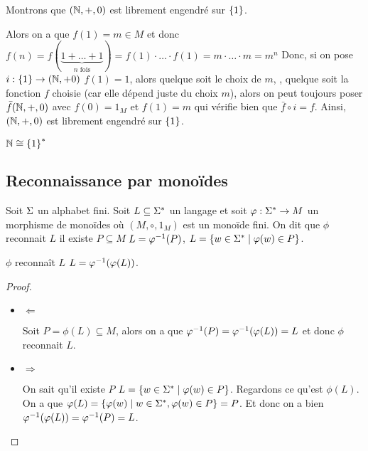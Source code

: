 \begin{exemple}
Montrons que $(\mathbb{N}, + , 0)$ est librement engendré sur $\left\{1\right\}$.


	Alors on a que $f(1) = m \in M$ et donc $f(n) =  f(\underbrace{1+\ldots+1}_{n \text{ fois}}) = f(1)\cdot \ldots \cdot f(1) = m\cdot \ldots \cdot m = m^n$
    Donc, si on pose $i: \left\{1\right\} \to (\mathbb{N}, + 0)$ \tq $f(1) = 1$, alors quelque soit le choix de $m$, \ie, quelque soit la fonction $f$ choisie (car elle dépend juste du choix $m$), alors 
    on peut toujours poser $\bar f (\mathbb{N}, +, 0)$ avec $f(0) = 1_M$ et $f(1) = m$ qui vérifie bien que $\bar f \circ i = f$. Ainsi, $(\mathbb{N}, +, 0)$ est librement engendré sur $\left\{1\right\}$.
\end{exemple}

\begin{remarque}
	$\mathbb{N} \cong \left\{1\right\}^*$
\end{remarque}

\subsection{Reconnaissance par monoïdes}

\begin{definition}
	Soit $\Sigma$ un alphabet fini. Soit $L \subseteq \Sigma^{*}$ un langage et soit $\varphi : \Sigma^{*} \to M$ un morphisme de monoïdes où $(M, \circ, 1_M)$ est un monoïde fini. On dit que
	$\phi$ reconnait $L$ \ssi il existe $P \subseteq M$ \tq $L = \varphi^{-1} (P)$, \cad $L = \left\{w \in \Sigma^{*} \mid \varphi (w) \in P\right\}$.
\end{definition}

\begin{exercice}
	$\phi$ reconnaît $L$ \ssi $L = \varphi^{-1} (\varphi (L))$.
\end{exercice}

\begin{proof}
    \begin{itemize}
        \item $\Leftarrow$

            Soit $P = \phi(L) \subseteq M$, alors on a que $\varphi^{-1} (P) = \varphi^{-1} (\varphi (L)) = L$ et donc $\phi$ reconnait $L$.

        \item $\Rightarrow$

            On sait qu'il existe $P$ \tq $L = \left\{w \in \Sigma^{*} \mid \varphi(w) \in P\right\}$. Regardons ce qu'est $\phi (L)$.
            On a que $\varphi (L) = \left\{\varphi (w) \mid w \in \Sigma^{*}, \varphi(w) \in P\right\} = P$. Et donc on a bien $\varphi^{-1} (\varphi (L)) = \varphi^{-1} (P) = L$.
    \end{itemize}
\end{proof}


